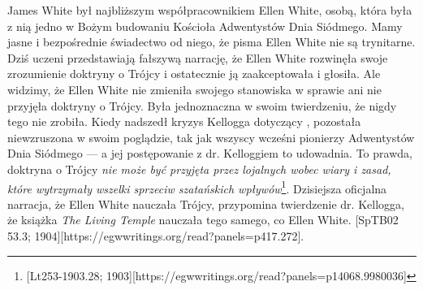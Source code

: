James White był najbliższym współpracownikiem Ellen White, osobą, która była z nią jedno w Bożym budowaniu Kościoła Adwentystów Dnia Siódmego. Mamy jasne i bezpośrednie świadectwo od niego, że pisma Ellen White nie są trynitarne. Dziś uczeni przedstawiają fałszywą narrację, że Ellen White rozwinęła swoje zrozumienie doktryny o Trójcy i ostatecznie ją zaakceptowała i głosiła. Ale widzimy, że Ellen White nie zmieniła swojego stanowiska w sprawie  ani nie przyjęła doktryny o Trójcy. Była jednoznaczna w swoim twierdzeniu, że nigdy tego nie zrobiła. Kiedy nadszedł kryzys Kellogga dotyczący , pozostała niewzruszona w swoim poglądzie, tak jak wszyscy wcześni pionierzy Adwentystów Dnia Siódmego — a jej postępowanie z dr. Kelloggiem to udowadnia. To prawda, doktryna o Trójcy \textit{nie może być przyjęta przez lojalnych wobec wiary i zasad, które wytrzymały wszelki sprzeciw szatańskich wpływów}\footnote{[Lt253-1903.28; 1903][https://egwwritings.org/read?panels=p14068.9980036]}. Dzisiejsza oficjalna narracja, że Ellen White nauczała Trójcy, przypomina twierdzenie dr. Kellogga, że książka \textit{The Living Temple} nauczała tego samego, co Ellen White. [SpTB02 53.3; 1904][https://egwwritings.org/read?panels=p417.272].


